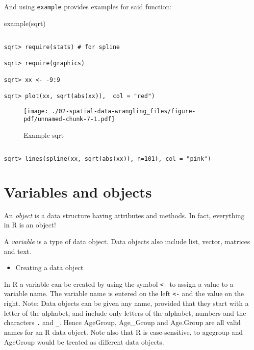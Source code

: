 \documentclass[
  letterpaper,
  krantz2]{style/krantz}
\newenvironment{Shaded}{\begin{snugshade}}{\end{snugshade}}
\newcommand{\FunctionTok}[1]{\textcolor[rgb]{0.28,0.35,0.67}{#1}}
\newcommand{\NormalTok}[1]{\textcolor[rgb]{0.00,0.23,0.31}{#1}}
\providecommand{\tightlist}{%
  \setlength{\itemsep}{0pt}\setlength{\parskip}{0pt}}\usepackage{longtable,booktabs,array}
\begin{document}
And using \texttt{example} provides examples for said function:

\begin{Shaded}
\begin{Highlighting}[]
\FunctionTok{example}\NormalTok{(sqrt)}
\end{Highlighting}
\end{Shaded}

\begin{verbatim}

sqrt> require(stats) # for spline

sqrt> require(graphics)

sqrt> xx <- -9:9

sqrt> plot(xx, sqrt(abs(xx)),  col = "red")
\end{verbatim}

\begin{figure}[H]

{\centering \texttt{[image: ./02-spatial-data-wrangling\_files/figure-pdf/unnamed-chunk-7-1.pdf]}

}

\caption{Example sqrt}

\end{figure}

\begin{verbatim}

sqrt> lines(spline(xx, sqrt(abs(xx)), n=101), col = "pink")
\end{verbatim}

\hypertarget{variables-and-objects}{%
\section{Variables and objects}\label{variables-and-objects}}

An \emph{object} is a data structure having attributes and methods. In
fact, everything in R is an object!

A \emph{variable} is a type of data object. Data objects also include
list, vector, matrices and text.

\begin{itemize}
\tightlist
\item
  Creating a data object
\end{itemize}

In R a variable can be created by using the symbol \texttt{\textless{}-}
to assign a value to a variable name. The variable name is entered on
the left \texttt{\textless{}-} and the value on the right. Note: Data
objects can be given any name, provided that they start with a letter of
the alphabet, and include only letters of the alphabet, numbers and the
characters \texttt{.} and \texttt{\_}. Hence AgeGroup, Age\_Group and
Age.Group are all valid names for an R data object. Note also that R is
case-sensitive, to agegroup and AgeGroup would be treated as different
data objects.
\end{document}
